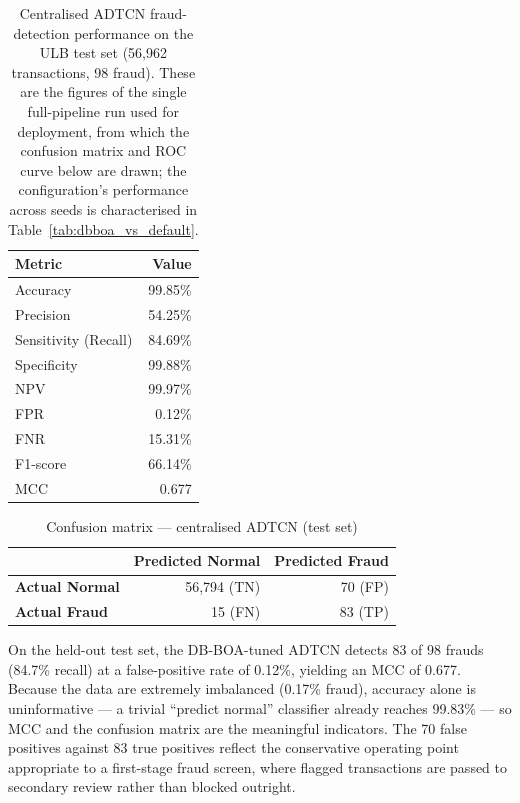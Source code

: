 \begin{table}[H]
\centering
\caption{Centralised ADTCN fraud-detection performance on the ULB test set (56{,}962 transactions, 98 fraud). These are the figures of the single full-pipeline run used for deployment, from which the confusion matrix and ROC curve below are drawn; the configuration's performance across seeds is characterised in Table~\ref{tab:dbboa_vs_default}.}
\label{tab:centralized_results}
\begin{tabular}{|l|r|}
\hline \textbf{Metric} & \textbf{Value} \\ \hline
Accuracy        & 99.85\% \\ \hline
Precision       & 54.25\% \\ \hline
Sensitivity (Recall) & 84.69\% \\ \hline
Specificity     & 99.88\% \\ \hline
NPV             & 99.97\% \\ \hline
FPR             & 0.12\% \\ \hline
FNR             & 15.31\% \\ \hline
F1-score        & 66.14\% \\ \hline
MCC             & 0.677 \\ \hline
\end{tabular}
\end{table}

\begin{table}[H]
\centering
\caption{Confusion matrix --- centralised ADTCN (test set)}
\label{tab:confusion_matrix}
\begin{tabular}{|l|r|r|}
\hline & \textbf{Predicted Normal} & \textbf{Predicted Fraud} \\ \hline
\textbf{Actual Normal} & 56{,}794 (TN) & 70 (FP) \\ \hline
\textbf{Actual Fraud}  & 15 (FN)       & 83 (TP) \\ \hline
\end{tabular}
\end{table}

\FloatBarrier

On the held-out test set, the DB-BOA-tuned ADTCN detects 83 of 98 frauds (84.7\% recall) at a false-positive rate of 0.12\%, yielding an MCC of 0.677. Because the data are extremely imbalanced (0.17\% fraud), accuracy alone is uninformative --- a trivial ``predict normal'' classifier already reaches 99.83\% --- so MCC and the confusion matrix are the meaningful indicators. The 70 false positives against 83 true positives reflect the conservative operating point appropriate to a first-stage fraud screen, where flagged transactions are passed to secondary review rather than blocked outright.

